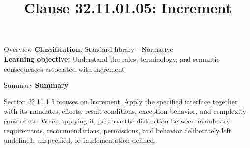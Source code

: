 \documentclass[10pt,letterpaper]{article}
\title{Clause 32.11.01.05: Increment}
\author{}
\date{}
\begin{document}
\maketitle
\begin{CornellOverviewBox}{Overview}
\textbf{Classification:} Standard library - Normative\\[2pt]
\textbf{Learning objective:} Understand the rules, terminology, and semantic consequences associated with Increment.
\end{CornellOverviewBox}\begin{CornellSummaryBox}{Summary}
{\sffamily\bfseries\color{Accent} Summary}\par\vspace{3pt}Section 32.11.1.5 focuses on Increment. Apply the specified interface together with its mandates, effects, result conditions, exception behavior, and complexity constraints. When applying it, preserve the distinction between mandatory requirements, recommendations, permissions, and behavior deliberately left undefined, unspecified, or implementation-defined.
\end{CornellSummaryBox}
\end{document}
